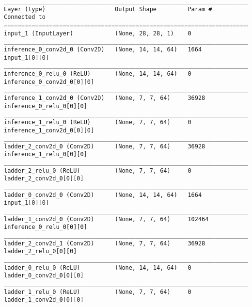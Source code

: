 \begin{lstlisting}[caption={Initial \ac{VLAE} network encoder used for network sparsity experiments},captionpos=b,basicstyle=\tiny, label={lst:sparsity-vlae-encoder-28-fm1}]
__________________________________________________________________________________________________
Layer (type)                    Output Shape         Param #     Connected to
==================================================================================================
input_1 (InputLayer)            (None, 28, 28, 1)    0
__________________________________________________________________________________________________
inference_0_conv2d_0 (Conv2D)   (None, 14, 14, 64)   1664        input_1[0][0]
__________________________________________________________________________________________________
inference_0_relu_0 (ReLU)       (None, 14, 14, 64)   0           inference_0_conv2d_0[0][0]
__________________________________________________________________________________________________
inference_1_conv2d_0 (Conv2D)   (None, 7, 7, 64)     36928       inference_0_relu_0[0][0]
__________________________________________________________________________________________________
inference_1_relu_0 (ReLU)       (None, 7, 7, 64)     0           inference_1_conv2d_0[0][0]
__________________________________________________________________________________________________
ladder_2_conv2d_0 (Conv2D)      (None, 7, 7, 64)     36928       inference_1_relu_0[0][0]
__________________________________________________________________________________________________
ladder_2_relu_0 (ReLU)          (None, 7, 7, 64)     0           ladder_2_conv2d_0[0][0]
__________________________________________________________________________________________________
ladder_0_conv2d_0 (Conv2D)      (None, 14, 14, 64)   1664        input_1[0][0]
__________________________________________________________________________________________________
ladder_1_conv2d_0 (Conv2D)      (None, 7, 7, 64)     102464      inference_0_relu_0[0][0]
__________________________________________________________________________________________________
ladder_2_conv2d_1 (Conv2D)      (None, 7, 7, 64)     36928       ladder_2_relu_0[0][0]
__________________________________________________________________________________________________
ladder_0_relu_0 (ReLU)          (None, 14, 14, 64)   0           ladder_0_conv2d_0[0][0]
__________________________________________________________________________________________________
ladder_1_relu_0 (ReLU)          (None, 7, 7, 64)     0           ladder_1_conv2d_0[0][0]

\end{lstlisting}
